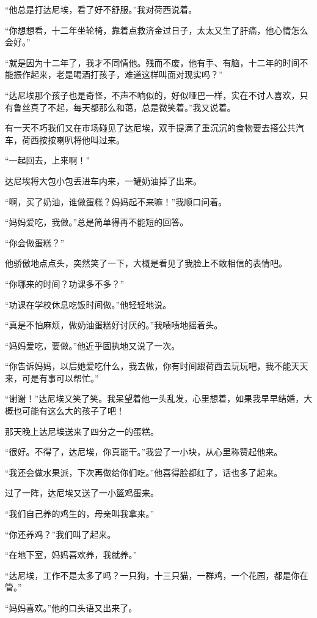 \par “他总是打达尼埃，看了好不舒服。”我对荷西说着。
\par “你想想看，十二年坐轮椅，靠着点救济金过日子，太太又生了肝癌，他心情怎么会好。”
\par “就是因为十二年了，我才不同情他。残而不废，他有手、有脑，十二年的时间不能振作起来，老是喝酒打孩子，难道这样叫面对现实吗？”
\par “达尼埃那个孩子也是奇怪，不声不响似的，好似哑巴一样，实在不讨人喜欢，只有鲁丝真了不起，每天都那么和蔼，总是微笑着。”我又说着。
\par 有一天不巧我们又在市场碰见了达尼埃，双手提满了重沉沉的食物要去搭公共汽车，荷西按按喇叭将他叫过来。
\par “一起回去，上来啊！”
\par 达尼埃将大包小包丢进车内来，一罐奶油掉了出来。
\par “啊，买了奶油，谁做蛋糕？妈妈起不来嘛！”我顺口问着。
\par “妈妈爱吃，我做。”总是简单得再不能短的回答。
\par “你会做蛋糕？”
\par 他骄傲地点点头，突然笑了一下，大概是看见了我脸上不敢相信的表情吧。
\par “你哪来的时间？功课多不多？”
\par “功课在学校休息吃饭时间做。”他轻轻地说。
\par “真是不怕麻烦，做奶油蛋糕好讨厌的。”我啧啧地摇着头。
\par “妈妈爱吃，要做。”他近乎固执地又说了一次。
\par “你告诉妈妈，以后她爱吃什么，我去做，你有时间跟荷西去玩玩吧，我不能天天来，可是有事可以帮忙。”
\par “谢谢！”达尼埃又笑了笑。我呆望着他一头乱发，心里想着，如果我早早结婚，大概也可能有这么大的孩子了吧！
\par 那天晚上达尼埃送来了四分之一的蛋糕。
\par “很好。不得了，达尼埃，你真能干。”我尝了一小块，从心里称赞起他来。
\par “我还会做水果派，下次再做给你们吃。”他喜得脸都红了，话也多了起来。
\par 过了一阵，达尼埃又送了一小篮鸡蛋来。
\par “我们自己养的鸡生的，母亲叫我拿来。”
\par “你还养鸡？”我们叫了起来。
\par “在地下室，妈妈喜欢养，我就养。”
\par “达尼埃，工作不是太多了吗？一只狗，十三只猫，一群鸡，一个花园，都是你在管。”
\par “妈妈喜欢。”他的口头语又出来了。
